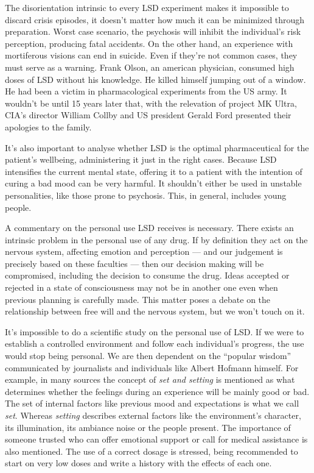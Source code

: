 The disorientation intrinsic to every LSD experiment makes it impossible to discard crisis episodes, it doesn't matter how much it can be minimized through preparation. Worst case scenario, the psychosis will inhibit the individual's risk perception, producing fatal accidents. On the other hand, an experience with mortiferous visions can end in suicide. Even if they're not common cases, they must serve as a warning. Frank Olson, an american physician, consumed high doses of LSD without his knowledge. He killed himself jumping out of a window. He had been a victim in pharmacological experiments from the US army. It wouldn't be until 15 years later that, with the relevation of project MK Ultra, CIA's director William Collby and US president Gerald Ford presented their apologies to the family.

It's also important to analyse whether LSD is the optimal pharmaceutical for the patient's wellbeing, administering it just in the right cases. Because LSD intensifies the current mental state, offering it to a patient with the intention of curing a bad mood can be very harmful. It shouldn't either be used in unstable personalities, like those prone to psychosis. This, in general, includes young people.

A commentary on the personal use LSD receives is necessary. There exists an intrinsic problem in the personal use of any drug. If by definition they act on the nervous system, affecting emotion and perception --- and our judgement is precisely based on these faculties --- then our decision making will be compromised, including the decision to consume the drug. Ideas accepted or rejected in a state of consciousness may not be in another one even when previous planning is carefully made. This matter poses a debate on the relationship between free will and the nervous system, but we won't touch on it.

It's impossible to do a scientific study on the personal use of LSD. If we were to establish a controlled environment and follow each individual's progress, the use would stop being personal. We are then dependent on the \enquote{popular wisdom} communicated by journalists and individuals like Albert Hofmann himself. For example, in many sources the concept of \textit{set and setting} is mentioned as what determines whether the feelings during an experience will be mainly good or bad. The set of internal factors like previous mood and expectations is what we call \textit{set}. Whereas \textit{setting} describes external factors like the environment's character, its illumination, its ambiance noise or the people present. The importance of someone trusted who can offer emotional support or call for medical assistance is also mentioned. The use of a correct dosage is stressed, being recommended to start on very low doses and write a history with the effects of each one.

